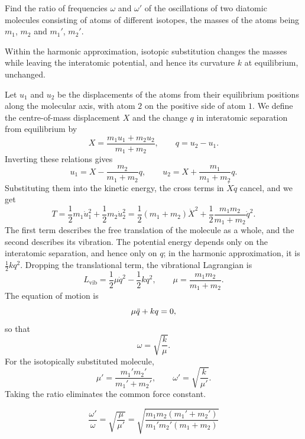
\begin{problem}[title={Frequencies of isotopic diatomic molecules}]
{
Find the ratio of frequencies $\omega$ and $\omega'$ of the oscillations of two diatomic molecules consisting of atoms of different isotopes, the masses of the atoms being $m_1$, $m_2$ and $m_1'$, $m_2'$.
}
{
Within the harmonic approximation, isotopic substitution changes the masses while leaving the interatomic potential, and hence its curvature $k$ at equilibrium, unchanged.

Let $u_1$ and $u_2$ be the displacements of the atoms from their equilibrium positions along the molecular axis, with atom $2$ on the positive side of atom $1$. We define the centre-of-mass displacement $X$ and the change $q$ in interatomic separation from equilibrium by
\begin{equation*}
    X = \frac{m_1u_1 + m_2u_2}{m_1 + m_2}, \qquad q = u_2 - u_1.
\end{equation*}
Inverting these relations gives
\begin{equation*}
    u_1 = X - \frac{m_2}{m_1 + m_2}q, \qquad u_2 = X + \frac{m_1}{m_1 + m_2}q.
\end{equation*}
Substituting them into the kinetic energy, the cross terms in $\Dot{X}\Dot{q}$ cancel, and we get
\begin{equation*}
    T = \frac{1}{2}m_1\Dot{u}_1^2 + \frac{1}{2}m_2\Dot{u}_2^2 = \frac{1}{2}(m_1 + m_2)\Dot{X}^2 + \frac{1}{2}\frac{m_1m_2}{m_1 + m_2}\Dot{q}^2.
\end{equation*}
The first term describes the free translation of the molecule as a whole, and the second describes its vibration. The potential energy depends only on the interatomic separation, and hence only on $q$; in the harmonic approximation, it is $\frac{1}{2}kq^2$. Dropping the translational term, the vibrational Lagrangian is
\begin{equation*}
    L_\mathrm{vib} = \frac{1}{2}\mu\Dot{q}^2 - \frac{1}{2}kq^2, \qquad \mu = \frac{m_1m_2}{m_1 + m_2}.
\end{equation*}
The equation of motion is
\begin{equation*}
    \mu\Ddot{q} + kq = 0,
\end{equation*}
so that
\begin{equation*}
    \omega = \sqrt{\frac{k}{\mu}}.
\end{equation*}
For the isotopically substituted molecule,
\begin{equation*}
    \mu' = \frac{m_1'm_2'}{m_1' + m_2'}, \qquad \omega' = \sqrt{\frac{k}{\mu'}}.
\end{equation*}
Taking the ratio eliminates the common force constant.
}
{
\begin{equation*}
    \frac{\omega'}{\omega} = \sqrt{\frac{\mu}{\mu'}} = \sqrt{\frac{m_1m_2\left(m_1' + m_2'\right)}{m_1'm_2'\left(m_1 + m_2\right)}}
\end{equation*}
}
\end{problem}

